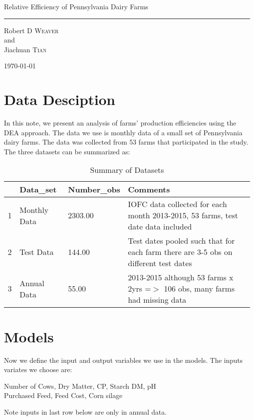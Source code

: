 \documentclass[12pt,]{article}
\begin{document}
\begin{titlepage}
\begin{center}

\vspace*{5em}
{\huge Relative Efficiency of Pennsylvania Dairy Farms\\[0.4cm] }
\color{blue}\hrule
\color{black}
\vspace{100mm}
\noindent
\Large 
Robert D \textsc{Weaver}\\
and\\
Jiachuan \textsc{Tian}

\today
\vfill
\end{center}
\end{titlepage}



\section{Data Desciption}
In this note, we present an analysis of farms' production efficiencies using the DEA approach. The data we use is monthly data of a small set of Pennsylvania dairy farms. The data was collected from 53 farms that participated in the study. The three datasets can be summarized as:



\begin{table}[ht]
\centering
\begin{tabularx}{\linewidth}{ll|l|X}
  \hline
 & Data\_set & Number\_obs & Comments \\ 
  \hline
1 & Monthly Data & 2303.00 & IOFC data collected for each month 2013-2015, 53 farms, test date data included \\ 
  2 & Test Data & 144.00 & Test dates pooled such that for each farm there are 3-5 obs on different test dates \\ 
  3 & Annual Data & 55.00 & 2013-2015 although 53 farms x 2yrs =$>$ 106 obs, many farms had missing data \\ 
   \hline
\end{tabularx}
\caption{Summary of Datasets} 
\label{Table-1}
\end{table}

\section{Models}
Now we define the input and output variables we use in the models. The inputs variates we choose are:
\begin{center}
Number of Cows, Dry Matter, CP, Starch DM, pH\\
Purchased Feed, Feed Cost, Corn silage\\
\end{center}
Note inputs in last row below are only in annual data.
\end{document}

